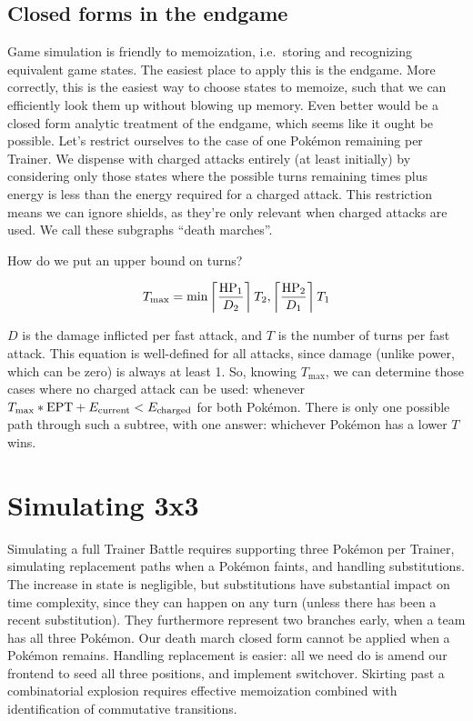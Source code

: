 

\subsection{Closed forms in the endgame\label{subsec:endgame}}
Game simulation is friendly to memoization, i.e.\ storing and recognizing equivalent game states.
The easiest place to apply this is the endgame.
More correctly, this is the easiest way to choose states to memoize,
  such that we can efficiently look them up without blowing up memory.
Even better would be a closed form analytic treatment of the endgame,
  which seems like it ought be possible.
Let's restrict ourselves to the case of one Pokémon remaining per Trainer.
We dispense with charged attacks entirely (at least initially) by considering
  only those states where the possible turns remaining times \EPT{} plus
  energy is less than the energy required for a charged attack.
This restriction means we can ignore shields, as they're only relevant
  when charged attacks are used.
We call these subgraphs ``death marches''.

How do we put an upper bound on turns?

\[ T_\mathrm{max} = \min \left\lceil\frac{\mbox{HP}_1}{D_2}\right\rceil T_2,\left\lceil\frac{\mbox{HP}_2}{D_1}\right\rceil T_1 \]

$D$ is the damage inflicted per fast attack, and $T$ is the number of turns per fast attack.
This equation is well-defined for all attacks, since damage (unlike power,
  which can be zero) is always at least 1.
So, knowing $T_\mathrm{max}$, we can determine those cases where no charged attack
  can be used: whenever $T_\mathrm{max} * \mathit{\mbox{EPT}{}} + E_\mathrm{current} < E_\mathrm{charged}$ for both Pokémon.
There is only one possible path through such a subtree, with one answer:
  whichever Pokémon has a lower $T$ wins.

\section{Simulating 3x3\label{sec:simul3x3}}
Simulating a full Trainer Battle requires supporting three Pokémon per Trainer,
  simulating replacement paths when a Pokémon faints,
  and handling substitutions.
The increase in state is negligible, but substitutions have substantial impact on time complexity,
  since they can happen on any turn (unless there has been a recent substitution).
They furthermore represent two branches early, when a team has all three Pokémon.
Our death march closed form cannot be applied when a Pokémon remains.
Handling replacement is easier: all we need do is amend our frontend to
  seed all three positions, and implement switchover.
Skirting past a combinatorial explosion requires effective memoization combined with
 identification of commutative transitions.

